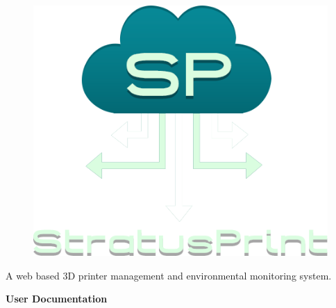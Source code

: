 \begin{titlepage}
\vspace*{\fill}
\pagecolor{titlepagecolor}
\color{white}

\begin{figure}[!h]
   \centerline{\includegraphics[scale=0.6]{images/sp-logo-transparent}}
\end{figure}

\begin{center}
	\LARGE\textsf{A web based 3D printer management and environmental monitoring system.}

	\vspace{1.8em}

	\Huge\textbf{\textsf{User Documentation}} \textcolor{titlepagecolor!20}{\textsf{}}
\end{center}

\vspace*{\fill}
\end{titlepage}